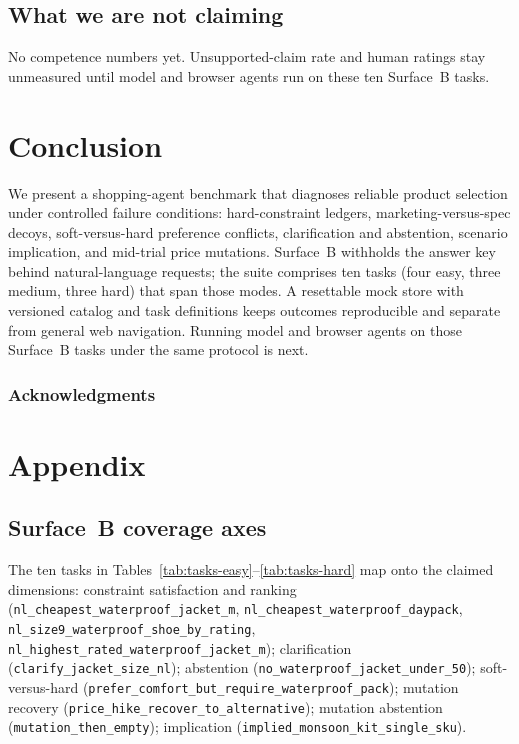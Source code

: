 \documentclass{article} %
\begin{document}
\subsection{What we are not claiming}

No competence numbers yet. Unsupported-claim rate and human ratings stay unmeasured until model and browser agents run on these ten Surface~B tasks.

\section{Conclusion}
\label{sec:conclusion}

We present a shopping-agent benchmark that diagnoses reliable product selection under controlled failure conditions: hard-constraint ledgers, marketing-versus-spec decoys, soft-versus-hard preference conflicts, clarification and abstention, scenario implication, and mid-trial price mutations. Surface~B withholds the answer key behind natural-language requests; the suite comprises ten tasks (four easy, three medium, three hard) that span those modes. A resettable mock store with versioned catalog and task definitions keeps outcomes reproducible and separate from general web navigation. Running model and browser agents on those Surface~B tasks under the same protocol is next.

\subsubsection*{Acknowledgments}




\appendix
\section{Appendix}
\label{sec:appendix}

\subsection{Surface~B coverage axes}
\label{app:tasks}

The ten tasks in Tables~\ref{tab:tasks-easy}--\ref{tab:tasks-hard} map onto the claimed dimensions: constraint satisfaction and ranking (\texttt{nl\_cheapest\_waterproof\_jacket\_m}, \texttt{nl\_cheapest\_waterproof\_daypack}, \texttt{nl\_size9\_waterproof\_shoe\_by\_rating}, \texttt{nl\_highest\_rated\_waterproof\_jacket\_m}); clarification (\texttt{clarify\_jacket\_size\_nl}); abstention (\texttt{no\_waterproof\_jacket\_under\_50}); soft-versus-hard (\texttt{prefer\_comfort\_but\_require\_waterproof\_pack}); mutation recovery (\texttt{price\_hike\_recover\_to\_alternative}); mutation abstention (\texttt{mutation\_then\_empty}); implication (\texttt{implied\_monsoon\_kit\_single\_sku}).
\end{document}
